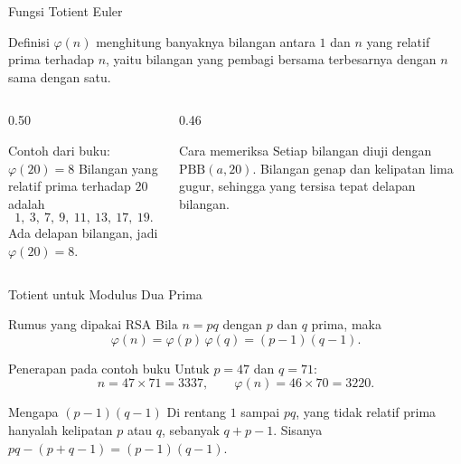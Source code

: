 \documentclass[aspectratio=169,11pt]{beamer}
\begin{document}
\begin{frame}{Fungsi Totient Euler}
    \footnotesize
    \begin{block}{Definisi}
        $\varphi(n)$ menghitung banyaknya bilangan antara $1$ dan $n$ yang
        relatif prima terhadap $n$, yaitu bilangan yang pembagi bersama
        terbesarnya dengan $n$ sama dengan satu.
    \end{block}
    \vspace{0.1cm}
    \begin{columns}[T,onlytextwidth]
        \begin{column}{0.50\textwidth}
            \begin{exampleblock}{Contoh dari buku: $\varphi(20) = 8$}
                \footnotesize
                Bilangan yang relatif prima terhadap $20$ adalah
                \[
                    1,\ 3,\ 7,\ 9,\ 11,\ 13,\ 17,\ 19 .
                \]
                Ada delapan bilangan, jadi $\varphi(20) = 8$.
            \end{exampleblock}
        \end{column}
        \begin{column}{0.46\textwidth}
            \begin{block}{Cara memeriksa}
                Setiap bilangan diuji dengan $\text{PBB}(a,20)$. Bilangan
                genap dan kelipatan lima gugur, sehingga yang tersisa tepat
                delapan bilangan.
            \end{block}
        \end{column}
    \end{columns}
\end{frame}

\begin{frame}{Totient untuk Modulus Dua Prima}
    \footnotesize
    \begin{block}{Rumus yang dipakai RSA}
        Bila $n = pq$ dengan $p$ dan $q$ prima, maka
        \[
            \varphi(n) = \varphi(p)\,\varphi(q) = (p-1)(q-1).
        \]
    \end{block}
    \begin{exampleblock}{Penerapan pada contoh buku}
        \footnotesize
        Untuk $p = 47$ dan $q = 71$:
        \[
            n = 47 \times 71 = 3337,
            \qquad
            \varphi(n) = 46 \times 70 = 3220 .
        \]
    \end{exampleblock}
    \begin{alertblock}{Mengapa $(p-1)(q-1)$}
        \footnotesize
        Di rentang $1$ sampai $pq$, yang tidak relatif prima hanyalah
        kelipatan $p$ atau $q$, sebanyak $q+p-1$. Sisanya
        $pq-(p+q-1)=(p-1)(q-1)$.
    \end{alertblock}
\end{frame}
\end{document}
